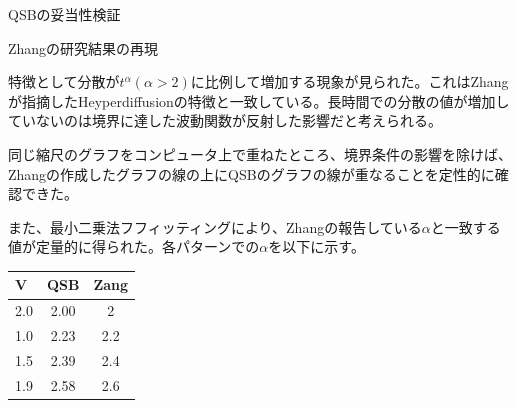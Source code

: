 \documentclass[a4paper, lualatex]{bxjsarticle}
\begin{document}
\begin{section}{QSBの妥当性検証}
\begin{subsection}{Zhangの研究結果の再現}
\begin{figure}[h]
        \end{figure}
        \par 特徴として分散が$t^\alpha(\alpha>2)$に比例して増加する現象が見られた。これはZhangが指摘したHeyperdiffusionの特徴と一致している。長時間での分散の値が増加していないのは境界に達した波動関数が反射した影響だと考えられる。
        \par 同じ縮尺のグラフをコンピュータ上で重ねたところ、境界条件の影響を除けば、Zhangの作成したグラフの線の上にQSBのグラフの線が重なることを定性的に確認できた。
        \par また、最小二乗法フフィッティングにより、Zhangの報告している$\alpha$と一致する値が定量的に得られた。各パターンでの$\alpha$を以下に示す。
        \begin{table}[h]
            \begin{tabular}{lcc}
                V&QSB & Zang\\ \hline
                2.0&2.00&2\\
                1.0&2.23&2.2\\
                1.5&2.39&2.4\\
                1.9&2.58&2.6
            \end{tabular}
        \end{table}
    \end{subsection}
\end{section}
\end{document}
